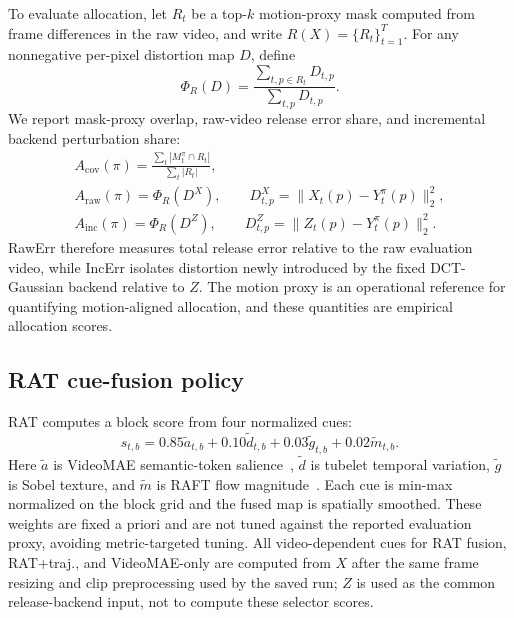To evaluate allocation, let \(R_t\) be a top-\(k\) motion-proxy mask computed
from frame differences in the raw video, and write \(R(X)=\{R_t\}_{t=1}^T\).
For any nonnegative per-pixel distortion map \(D\), define
\begin{equation}
\Phi_R(D)=
\frac{\sum_{t,p\in R_t}D_{t,p}}{\sum_{t,p}D_{t,p}} .
\end{equation}
We report mask-proxy overlap, raw-video release error share, and incremental
backend perturbation share:
\begin{equation}
\begin{gathered}
A_{\mathrm{cov}}(\pi)=
\frac{\sum_t |M_t^\pi\cap R_t|}{\sum_t |R_t|},\\
A_{\mathrm{raw}}(\pi)=\Phi_R(D^X), \qquad
D^X_{t,p}=\|X_t(p)-Y_t^\pi(p)\|_2^2,\\
A_{\mathrm{inc}}(\pi)=\Phi_R(D^Z), \qquad
D^Z_{t,p}=\|Z_t(p)-Y_t^\pi(p)\|_2^2 .
\end{gathered}
\end{equation}
RawErr therefore measures total release error relative to the raw evaluation
video, while IncErr isolates distortion newly introduced by the fixed
DCT-Gaussian backend relative to \(Z\). The motion proxy is an operational
reference for quantifying motion-aligned allocation, and these quantities are
empirical allocation scores.

\subsection{RAT cue-fusion policy}

RAT computes a block score from four normalized cues:
\begin{equation}
s_{t,b}=0.85\tilde a_{t,b}+0.10\tilde d_{t,b}
       +0.03\tilde g_{t,b}+0.02\tilde m_{t,b}.
\end{equation}
Here \(\tilde a\) is VideoMAE semantic-token salience~\cite{tong2022videomae},
\(\tilde d\) is tubelet temporal variation, \(\tilde g\) is Sobel texture, and
\(\tilde m\) is RAFT flow magnitude~\cite{teed2020raft}. Each cue is min-max
normalized on the block grid and the fused map is spatially smoothed. These
weights are fixed a priori and are not tuned against the reported evaluation
proxy, avoiding metric-targeted tuning.
All video-dependent cues for RAT fusion, RAT+traj., and VideoMAE-only are
computed from \(X\) after the same frame resizing and clip preprocessing used
by the saved run; \(Z\) is used as the common release-backend input, not to
compute these selector scores.

